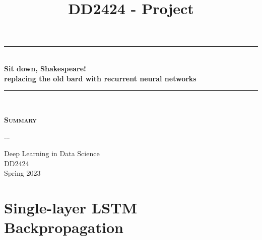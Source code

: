 \documentclass{article}
\title{DD2424 - Project}
\begin{document}

	\begin{titlepage}
		\begin{center} 
			
			\rule{\linewidth}{0.5mm}\\[0.5 cm]
			{ \huge \bfseries Sit down, Shakespeare!}\\[0.3 cm]
			{ \bfseries replacing the old bard with recurrent neural networks}\\[0.3cm]
			\rule{\linewidth}{0.5mm}\\[1 cm]
					
			\small\vfill
			\begin{center}
			\centering
			{\large \bfseries \textsc{Summary}}\\
			\vspace{1cm}
			\begin{minipage}{10cm}
				
				...
			\end{minipage}
			\end{center}
			\large\vfill
						

		\end{center}	
		
		\begin{minipage}{0.4\textwidth}
			\begin{flushleft} \small
				Deep Learning in Data Science\\
				DD2424\\
				Spring 2023
			\end{flushleft}
		\end{minipage}	

	\end{titlepage}

\newpage

\section*{Single-layer LSTM Backpropagation}
\end{document}
